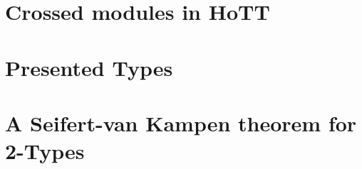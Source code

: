 \section{Crossed modules in HoTT}

\section{Presented Types}

\section{A Seifert-van Kampen theorem for 2-Types}

